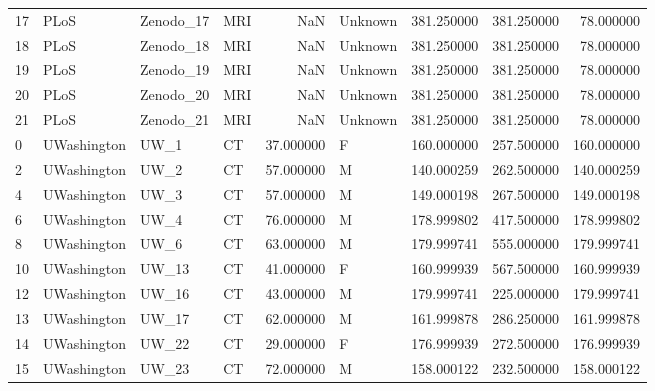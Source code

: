 \begin{tabular}{llllrlrrr}
17     &            PLoS &    Zenodo\_17 &                MRI &        NaN &  Unknown &       381.250000 &    381.250000 &   78.000000 \\
18     &            PLoS &    Zenodo\_18 &                MRI &        NaN &  Unknown &       381.250000 &    381.250000 &   78.000000 \\
19     &            PLoS &    Zenodo\_19 &                MRI &        NaN &  Unknown &       381.250000 &    381.250000 &   78.000000 \\
20     &            PLoS &    Zenodo\_20 &                MRI &        NaN &  Unknown &       381.250000 &    381.250000 &   78.000000 \\
21     &            PLoS &    Zenodo\_21 &                MRI &        NaN &  Unknown &       381.250000 &    381.250000 &   78.000000 \\
0      &     UWashington &         UW\_1 &                 CT &  37.000000 &        F &       160.000000 &    257.500000 &  160.000000 \\
2      &     UWashington &         UW\_2 &                 CT &  57.000000 &        M &       140.000259 &    262.500000 &  140.000259 \\
4      &     UWashington &         UW\_3 &                 CT &  57.000000 &        M &       149.000198 &    267.500000 &  149.000198 \\
6      &     UWashington &         UW\_4 &                 CT &  76.000000 &        M &       178.999802 &    417.500000 &  178.999802 \\
8      &     UWashington &         UW\_6 &                 CT &  63.000000 &        M &       179.999741 &    555.000000 &  179.999741 \\
10     &     UWashington &        UW\_13 &                 CT &  41.000000 &        F &       160.999939 &    567.500000 &  160.999939 \\
12     &     UWashington &        UW\_16 &                 CT &  43.000000 &        M &       179.999741 &    225.000000 &  179.999741 \\
13     &     UWashington &        UW\_17 &                 CT &  62.000000 &        M &       161.999878 &    286.250000 &  161.999878 \\
14     &     UWashington &        UW\_22 &                 CT &  29.000000 &        F &       176.999939 &    272.500000 &  176.999939 \\
15     &     UWashington &        UW\_23 &                 CT &  72.000000 &        M &       158.000122 &    232.500000 &  158.000122 \\

\end{tabular}
